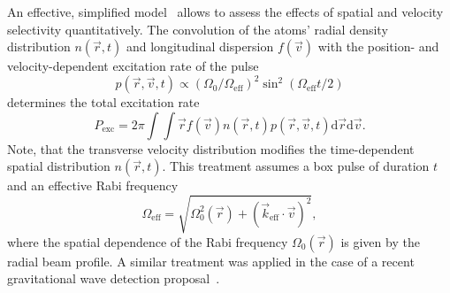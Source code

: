 An effective, simplified model~\cite{CheinetPhD} allows to assess the effects of spatial and velocity selectivity quantitatively. 
The convolution of the atoms' radial density distribution $n(\vec r,t)$  and longitudinal dispersion $f(\vec v)$ with the position- and velocity-dependent excitation rate of the pulse
\begin{equation}
    p(\vec r,\vec v,t)\propto (\Omega_0/\Omega_\text{eff})^2 \sin^2(\Omega_\text{eff} t/2)
\end{equation}
determines the total excitation rate
\begin{equation}
    \label{eq:exc-prob}
    P_\text{exc}=2\pi \int\int \vec r f(\vec v) n(\vec r,t) p(\vec r,\vec v,t) \text{d}\vec r \text{d}\vec v.
\end{equation}
Note, that the transverse velocity distribution modifies the time-dependent spatial distribution $n(\vec r,t)$. 
This treatment assumes a box pulse of duration $t$ and an effective Rabi frequency
\begin{equation}
    \Omega_\text{eff}= \sqrt{\Omega^2_0(\vec r)+(\vec k_\text{eff}\cdot\vec v)^2},
\end{equation}
where the spatial dependence of the Rabi frequency $\Omega_0(\vec r)$ is given by the radial beam profile. A similar treatment was applied in the case of a recent gravitational wave detection proposal~\cite{Loriani2019}.
%
